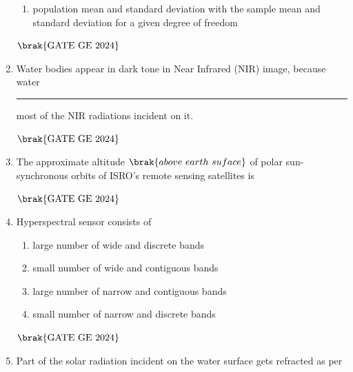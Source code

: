 \documentclass[journal,12pt,onecolumn]{IEEEtran}
\theoremstyle{remark}
\begin{document}
\begin{enumerate}
\begin{enumerate}
\item population mean and standard deviation with the sample mean 
and standard deviation for a given degree of freedom
\end{enumerate}
\hfill $\brak{\text{GATE GE 2024}}$
\bigskip
\item Water bodies appear in dark tone in Near Infrared (NIR) image, because water \rule{2cm}{0.5mm} most of the NIR radiations incident on it.
\begin{enumerate}
\end{enumerate}
\hfill $\brak{\text{GATE GE 2024}}$
\bigskip
\item The approximate altitude $\brak{above\ earth\ suface}$ of polar sun-synchronous orbits of ISRO's remote sensing satellites is
\begin{enumerate}
\end{enumerate}
\hfill $\brak{\text{GATE GE 2024}}$
\bigskip
\item Hyperspectral sensor consists of
\begin{enumerate}
\item large number of wide and discrete bands
\item small number of wide and contiguous bands
\item large number of narrow and contiguous bands
\item small number of narrow and discrete bands
\end{enumerate}
\hfill $\brak{\text{GATE GE 2024}}$
\bigskip
\item Part of the solar radiation incident on the water surface gets refracted as per
\begin{enumerate}
\end{enumerate}
\end{enumerate}
\end{document}
